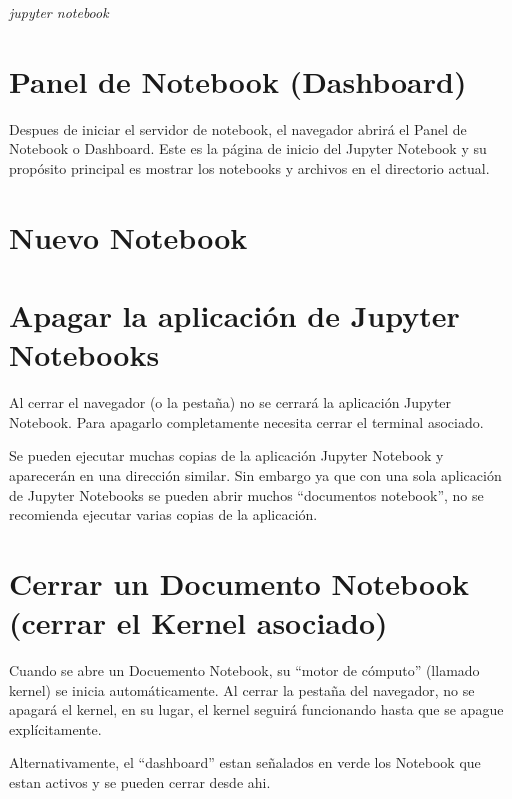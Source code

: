 \documentclass[11pt]{article}
\begin{document}
\emph{jupyter notebook}

    \hypertarget{panel-de-notebook-dashboard}{%
\section{Panel de Notebook
(Dashboard)}\label{panel-de-notebook-dashboard}}

Despues de iniciar el servidor de notebook, el navegador abrirá el Panel
de Notebook o Dashboard. Este es la página de inicio del Jupyter
Notebook y su propósito principal es mostrar los notebooks y archivos en
el directorio actual.

    \hypertarget{nuevo-notebook}{%
\section{Nuevo Notebook}\label{nuevo-notebook}}

    \hypertarget{apagar-la-aplicaciuxf3n-de-jupyter-notebooks}{%
\section{Apagar la aplicación de Jupyter
Notebooks}\label{apagar-la-aplicaciuxf3n-de-jupyter-notebooks}}

Al cerrar el navegador (o la pestaña) no se cerrará la aplicación
Jupyter Notebook. Para apagarlo completamente necesita cerrar el
terminal asociado.

Se pueden ejecutar muchas copias de la aplicación Jupyter Notebook y
aparecerán en una dirección similar. Sin embargo ya que con una sola
aplicación de Jupyter Notebooks se pueden abrir muchos ``documentos
notebook'', no se recomienda ejecutar varias copias de la aplicación.

    \hypertarget{cerrar-un-documento-notebook-cerrar-el-kernel-asociado}{%
\section{Cerrar un Documento Notebook (cerrar el Kernel
asociado)}\label{cerrar-un-documento-notebook-cerrar-el-kernel-asociado}}

Cuando se abre un Docuemento Notebook, su ``motor de cómputo'' (llamado
kernel) se inicia automáticamente. Al cerrar la pestaña del navegador,
no se apagará el kernel, en su lugar, el kernel seguirá funcionando
hasta que se apague explícitamente.

    Alternativamente, el ``dashboard'' estan señalados en verde los Notebook
que estan activos y se pueden cerrar desde ahi.
\end{document}

